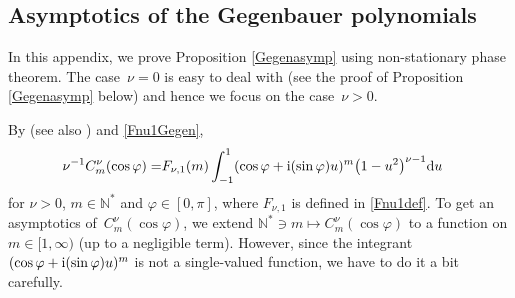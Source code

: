 \documentclass[pdftex]{sigma}
\numberwithin{equation}{section}
\def\f{\varphi}
\def\n{\nu}
\begin{document}
\subsection{Asymptotics of the Gegenbauer polynomials}\label{appasymgegensubsec}

In this appendix, we prove Proposition \ref{Gegenasymp} using non-stationary phase theorem. The case~${\n=0}$ is easy to deal with (see the proof of Proposition \ref{Gegenasymp} below) and hence we focus on the case~${\n>0}$.

By \cite[equation~(4.30)]{BKO} (see also \cite[Section 10]{IJ}) and \eqref{Fnu1Gegen},
\begin{align}\label{Gegenintrep}
\n^{-1}C_m^{\n}(\cos\f)=&F_{\n,1}(m)\int_{-1}^{1}(\cos\f+{\rm i}(\sin\f)u)^m\bigl(1-u^2\bigr)^{\n-1}{\rm d}u
\end{align}
for $\n>0$, $m\in\mathbb{N}^*$ and $\f\in [0,\pi]$, where $F_{\n,1}$ is defined in \eqref{Fnu1def}. To get an asymptotics of~$C_m^{\n}(\cos\f)$, we extend $\mathbb{N}^*\ni m\mapsto C_m^{\n}(\cos\f)$ to a function on $m\in [1,\infty)$ (up to a negligible term). However, since the integrant $(\cos\f+{\rm i}(\sin\f)u)^m$ is not a single-valued function, we have to do it a bit carefully.
\end{document}
